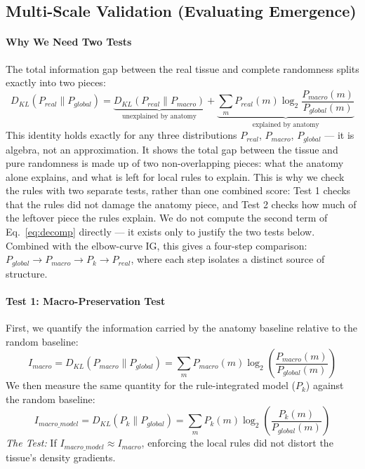\documentclass[10pt, a4paper]{article}
\begin{document}
\subsection{Multi-Scale Validation (Evaluating Emergence)}

\paragraph{Why We Need Two Tests}
The total information gap between the real tissue and complete randomness splits exactly into two pieces:
\begin{equation}
    D_{KL}(P_{real} \parallel P_{global}) =
    \underbrace{D_{KL}(P_{real} \parallel P_{macro})}_{\text{unexplained by anatomy}}
    +
    \underbrace{\sum_{m} P_{real}(m) \log_2 \frac{P_{macro}(m)}{P_{global}(m)}}_{\text{explained by anatomy}}
    \label{eq:decomp}
\end{equation}
This identity holds exactly for any three distributions $P_{real}$, $P_{macro}$, $P_{global}$ — it is algebra, not an approximation. It shows the total gap between the tissue and pure randomness is made up of two non-overlapping pieces: what the anatomy alone explains, and what is left for local rules to explain. This is why we check the rules with two separate tests, rather than one combined score: Test 1 checks that the rules did not damage the anatomy piece, and Test 2 checks how much of the leftover piece the rules explain. We do not compute the second term of Eq.~\ref{eq:decomp} directly — it exists only to justify the two tests below. Combined with the elbow-curve IG, this gives a four-step comparison: $P_{global} \to P_{macro} \to P_k \to P_{real}$, where each step isolates a distinct source of structure.

\paragraph{Test 1: Macro-Preservation Test}
First, we quantify the information carried by the anatomy baseline relative to the random baseline:
\begin{equation}
    I_{macro} = D_{KL}(P_{macro} \parallel P_{global}) = \sum_{m} P_{macro}(m) \log_2 \left( \frac{P_{macro}(m)}{P_{global}(m)} \right)
\end{equation}
We then measure the same quantity for the rule-integrated model ($P_k$) against the random baseline:
\begin{equation}
    I_{macro\_model} = D_{KL}(P_k \parallel P_{global}) = \sum_{m} P_k(m) \log_2 \left( \frac{P_k(m)}{P_{global}(m)} \right)
\end{equation}
\textit{The Test:} If $I_{macro\_model} \approx I_{macro}$, enforcing the local rules did not distort the tissue's density gradients.
\end{document}
